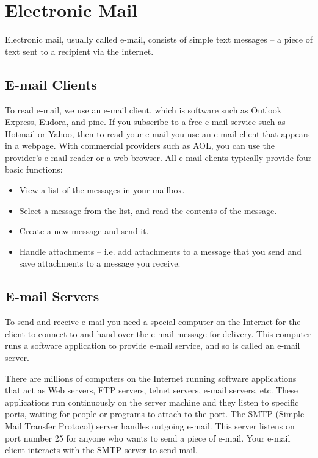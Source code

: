 \documentclass[12pt]{article}
\begin{document}


\section{Electronic Mail}

Electronic mail, usually called e-mail, consists of simple text messages -- 
a piece of text sent to a recipient via the internet. 

\subsection*{E-mail Clients}

To read e-mail, we use an e-mail client, which is software
such as Outlook Express, Eudora, and pine.
If you subscribe to a free e-mail service such as
Hotmail or Yahoo, then to read your e-mail 
you use an e-mail client that appears in a webpage.
With commercial providers such as AOL, you 
can use the provider's e-mail reader or a web-browser. 
All e-mail clients typically provide four basic 
functions: 

\begin{itemize}
\item View a list of the messages in your mailbox.

\item Select a message from the list, and read the 
contents of the message.

\item Create a new message and send it. 

\item Handle attachments -- i.e. add attachments to a message that you 
send and save attachments to a message you receive. 
\end{itemize}


\subsection*{E-mail Servers}
To send and receive e-mail you need a special 
computer on the Internet for the client to connect
to and hand over the e-mail message for delivery.
This computer runs a software application to
provide e-mail service, and so is called an
e-mail server.

There are millions of computers on the Internet
running software applications that act as 
Web servers, FTP servers, telnet servers, 
e-mail servers, etc. 
These applications run continuously on the server
machine and they listen to specific ports, 
waiting for people or programs to attach to the port. 
The SMTP (Simple Mail Transfer Protocol) server
handles outgoing e-mail.
This server listens on port number 25 for 
anyone who wants to send a piece of e-mail.
Your e-mail client interacts with the SMTP
server to send mail.
\end{document}
